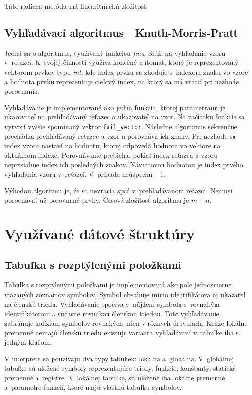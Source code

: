 \documentclass[11pt,a4paper]{article}
\begin{document}
	Táto radiaca metóda má linearitmickú zložitosť.

	\subsection{Vyhľadávací algoritmus\,-- Knuth-Morris-Pratt}

	Jedná sa o algoritmus, využívaný funkciou \textit{find}. Slúži na vyhľadanie vzoru v~reťazci. K~svojej činnosti využíva konečný automat, ktorý je reprezentovaný vektorom prvkov typu \textit{int}, kde index prvku sa zhoduje s~indexom znaku vo vzore a hodnota prvku reprezentuje cieľový index, na ktorý sa má vrátiť pri nezhode porovnania.

	Vyhľadávanie je implementované ako jedna funkcia, ktorej parametrami je ukazovateľ na prehľadávaný reťazec a ukazovateľ na vzor. Na začiatku funkcie sa vytvorí vyššie spomínaný vektor \texttt{fail\_vector}. Následne algoritmus sekvenčne prechádza prehľadávaný reťazec a vzor a porovnáva ich znaky. Pri nezhode sa index vzoru nastaví na hodnotu, ktorej odpovedá hodnota vo vektore na aktuálnom indexe. Porovnávanie prebieha, pokiaľ index reťazca a vzoru nepresiahne	index ich posledných znakov. Návratovou hodnotou je index prvého vyhľadania vzoru v~reťazci. V~prípade neúspechu $-1$.

	Výhodou algoritmu je, že sa nevracia späť v~prehľadávanom reťazci. Nemusí porovnávať už porovnané prvky. Časová zložitosť algoritmu je ${m+n}$.

	\section{Využívané dátové štruktúry}
	\label{struktury}

	\subsection{Tabuľka s rozptýlenými položkami}
	Tabuľka s rozptýlenými položkami je implementovaná ako pole jednosmerne
	viazaných zoznamov symbolov. Symbol obsahuje
	mimo identifikátora aj ukazateľ na členskú triedu. Vyhľadávanie spočíva
	v~nájdení symbolu s~rovnakým identifikátorom
	a súčasne rovnakou členskou triedou. Toto vyhľadávanie zabráňuje kolíziam
	symbolov rovnakých mien v rôznych úrovniach.
	Kedže lokálne premenné nemajú členskú triedu existuje varianta vyhľadávaní v~tabuľke
	iba s jedným kľúčom.

	V interprete sa používaju dva typy tabuliek: lokálna a~globálna. V~globálnej
	tabuľke sú uložené symboly reprezentujúce triedy, funkcie, konštanty, statické
	premenné a~registre. V~lokálnej tabuľke, sú uložené iba lokálne premenné a~parametre
	funkcií, ktoré majú vlastnú tabuľku symbolov.
\end{document}
